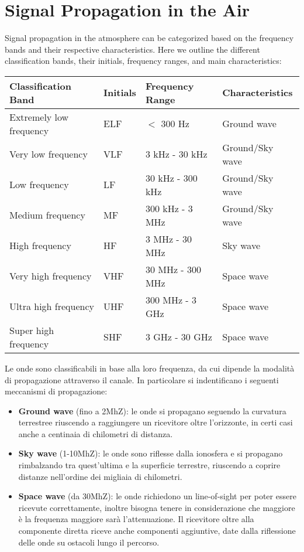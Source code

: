 \section*{Signal Propagation in the Air}

Signal propagation in the atmosphere can be categorized based on the frequency bands and their respective characteristics. Here we outline the different classification bands, their initials, frequency ranges, and main characteristics:

\begin{table}[h!]
\centering
\begin{tabular}{llll}
\hline
\textbf{Classification Band} & \textbf{Initials} & \textbf{Frequency Range} & \textbf{Characteristics} \\
\hline
Extremely low frequency & ELF & $<$ 300 Hz & Ground wave \\
Very low frequency & VLF & 3 kHz - 30 kHz & Ground/Sky wave \\
Low frequency & LF & 30 kHz - 300 kHz & Ground/Sky wave \\
Medium frequency & MF & 300 kHz - 3 MHz & Ground/Sky wave \\
High frequency & HF & 3 MHz - 30 MHz & Sky wave \\
Very high frequency & VHF & 30 MHz - 300 MHz & Space wave \\
Ultra high frequency & UHF & 300 MHz - 3 GHz & Space wave \\
Super high frequency & SHF & 3 GHz - 30 GHz & Space wave \\
\hline
\end{tabular}
\end{table}


Le onde sono classificabili in base alla loro frequenza, da cui dipende la modalità di propagazione attraverso il canale. In particolare si indentificano i seguenti meccanismi di propagazione:

\begin{itemize}
    \item \textbf{Ground wave} (fino a 2MhZ): le onde si propagano seguendo la curvatura terrestree riuscendo a raggiungere un ricevitore oltre l'orizzonte, in certi casi anche a centinaia di chilometri di distanza.
    \item \textbf{Sky wave} (1-10MhZ): le onde sono riflesse dalla ionosfera e si propagano rimbalzando tra quest'ultima e la superficie terrestre, riuscendo a coprire distanze nell'ordine dei migliaia di chilometri.
    \item \textbf{Space wave} (da 30MhZ): le onde richiedono un line-of-sight per poter essere ricevute correttamente, inoltre bisogna tenere in considerazione che maggiore è la frequenza maggiore sarà l'attenuazione. Il ricevitore oltre alla componente diretta riceve anche componenti aggiuntive, date dalla riflessione delle onde su ostacoli lungo il percorso.
\end{itemize}



